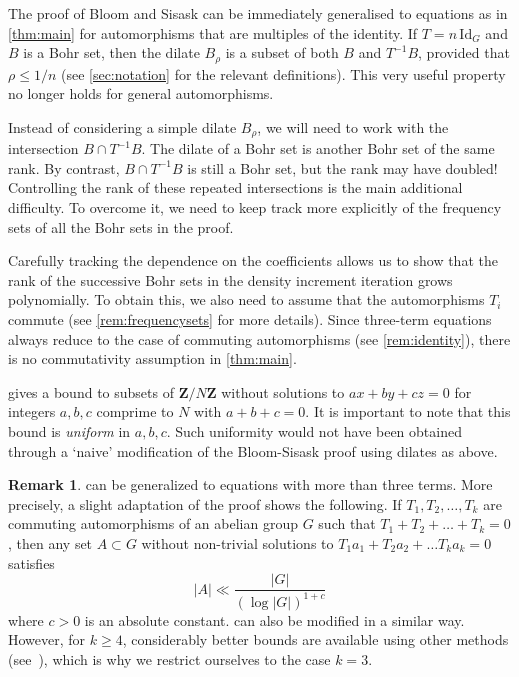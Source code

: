 \documentclass{daj}
\theoremstyle{definition}
\newtheorem{remark}[theorem]{Remark}
\newcommand{\Z}{\ensuremath{\mathbf{Z}}}
\begin{document}
The proof of Bloom and Sisask can be immediately generalised to equations as in \cref{thm:main} for automorphisms that are multiples of the identity. If $T = n\, \mathrm{Id}_G$ and $B$ is a Bohr set, then the dilate $B_{\rho}$ is a subset of both $B$ and $T^{-1}B$, provided that $\rho \leq 1/n$ (see \cref{sec:notation} for the relevant definitions). This very useful property no longer holds for general automorphisms. 

Instead of considering a simple dilate $B_{\rho}$, we will need to work with the intersection $B \cap T^{-1}B$. The dilate of a Bohr set is another Bohr set of the same rank. By contrast, $B \cap T^{-1}B$ is still a Bohr set, but the rank may have doubled! Controlling the rank of these repeated intersections is the main additional difficulty. To overcome it, we need to keep track more explicitly of the frequency sets of all the Bohr sets in the proof.

Carefully tracking the dependence on the coefficients allows us to show that the rank of the successive Bohr sets in the density increment iteration grows polynomially. To obtain this, we also need to assume that the automorphisms $T_i$ commute (see \cref{rem:frequencysets} for more details). Since three-term equations always reduce to the case of commuting automorphisms (see \cref{rem:identity}), there is no commutativity assumption in \cref{thm:main}.

 gives a bound to subsets of $\Z/N\Z$ without solutions to $ax+by+cz=0$ for integers $a,b,c$ comprime to $N$ with $a+b+c = 0$. It is important to note that this bound is \emph{uniform} in $a,b,c$. Such uniformity would not have been obtained through a `naive' modification of the Bloom-Sisask proof using dilates as above.


\begin{remark}
\label{rem:moreterms}
 can be generalized to equations with more than three terms. More precisely, a slight adaptation of the proof shows the following. If $T_1, T_2, \dots, T_k$ are commuting automorphisms of an abelian group $G$ such that $T_1 + T_2 + \dots + T_k = 0$, then any set $A \subset G$ without non-trivial solutions to $T_1a_1 + T_2a_2 + \dots T_ka_k = 0$ satisfies 
\begin{equation*}
|A| \ll \frac{|G|}{(\log|G|)^{1+c}}
\end{equation*}
where $c > 0$ is an absolute constant.  can also be modified in a similar way. However, for $k \geq 4$, considerably better bounds are available using other methods (see~\cite{schoen}), which is why we restrict ourselves to the case $k=3$.
\end{remark}
\end{document}

